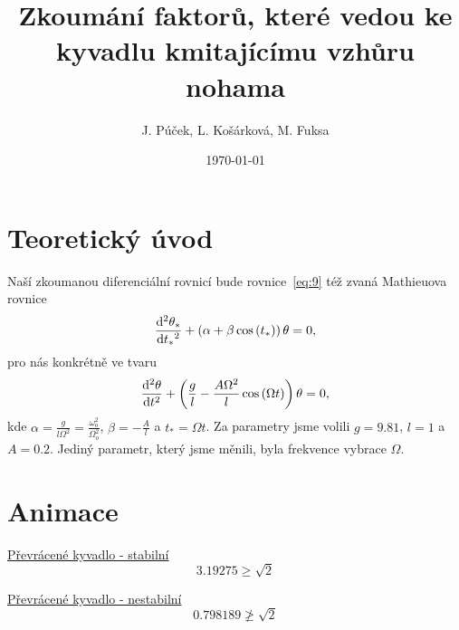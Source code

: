 \documentclass{beamer}
\title[Převrácené kyvadlo]{Zkoumání faktorů, které vedou ke kyvadlu kmitajícímu vzhůru nohama}
\author[J. P., L. K., M. F.]{J. Púček, L. Košárková, M. Fuksa}
\institute[Univerzita Karlova]{Univerzita Karlova, Česká republika}
\date{\today}
\begin{document}
\begin{frame}
\titlepage
\end{frame}

\section{Teoretický úvod}
\label{sec:uvod}

\begin{frame}
\begin{center}
			Naší zkoumanou diferenciální rovnicí bude rovnice~\eqref{eq:9} též zvaná Mathieuova rovnice
		\begin{equation}
			\label{eq:9}
			\frac{\mathrm{d}^2 {\theta_{*}}}{\mathrm{d} {t_{*}}^2}
			+
			\left(
			\alpha
			+
			\beta \cos \left( t_{*} \right)
			\right)
			\theta
			=
			0
			,
		\end{equation}
			pro nás konkrétně ve tvaru
		\begin{equation}
			\label{eq:10}
			\frac{\mathrm{d}^2 {\theta}}{\mathrm{d} {t}^2}
			+
			\left(
			\frac{g}{l}
			-
			\frac{A \Omega^2}{l} \cos \left( \Omega t \right)
			\right)
			\theta
			=
			0
			,
		\end{equation}
			kde $\alpha=\frac{g}{l\Omega^2}=\frac{\omega_{o}^2}{\Omega_{o}^2}$, $ \beta=-\frac{A}{l}$ a $t_{*}=\Omega t$. Za parametry jsme volili $g=9.81$, $l=1$ a $A=0.2$. Jediný parametr, který jsme měnili, byla frekvence vybrace $\Omega$.
		\end{center}
\end{frame}

\section{Animace}
\label{sec:animace}

\begin{frame}
\begin{center}
\href{run:./animace.mp4}{Převrácené kyvadlo - stabilní}
\begin{equation*}
3.19275 \geq \sqrt{2}
\end{equation*}
\end{center}
\end{frame}

\begin{frame}
\begin{center}
\href{run:./animace2.mp4}{Převrácené kyvadlo - nestabilní}
\begin{equation*}
0.798189 \ngeq \sqrt{2}
\end{equation*}
\end{center}
\end{frame}
\end{document}

